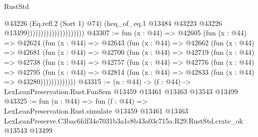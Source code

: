 \begin{lexlean}{RustStd}
\begin{coremodule}
                                            @43226
                                            (Eq.refl.{2} (Sort 1) @74)
                                            (heq_of_eq.{1}
                                              @13484
                                              @43223
                                              @43226
                                              @13499)))))))))))))))))))))
@43307 := fun (x : @44) =>
  @42605
    (fun (x : @44) =>
    @42624
      (fun (x : @44) =>
      @42643
        (fun (x : @44) =>
        @42662
          (fun (x : @44) =>
          @42681
            (fun (x : @44) =>
            @42700
              (fun (x : @44) =>
              @42719
                (fun (x : @44) =>
                @42738
                  (fun (x : @44) =>
                  @42757
                    (fun (x : @44) =>
                    @42776
                      (fun (x : @44) =>
                      @42795
                        (fun (x : @44) =>
                        @42814 (fun (x : @44) => @42833 (fun (x : @44) => @43280)))))))))))))
@43315 := (n : @44) ->
  (f : @44) -> LexLeanPreservation.Rust.FunSem @13459 @13461 @13463 @13543 @13499
@43325 := fun (n : @44) =>
  fun (f : @44) =>
  LexLeanPreservation.Rust.simulate
    @13459
    @13461
    @13463
    LexLeanPreserve.C3bac6fdf34e7031b3a1c8b43a03c715a.R29.RustStd.crate_ok
    @13543
    @13499
\end{coremodule}
\end{lexlean}
